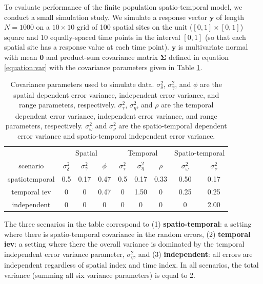 \documentclass[]{interact}
\theoremstyle{plain}%
\theoremstyle{definition}
\theoremstyle{remark}
\begin{document}
To evaluate performance of the finite population spatio-temporal model,
we conduct a small simulation study. We simulate a response vector
\(\mathbf{y}\) of length \(N = 1000\) on a \(10 \times 10\) grid of 100
spatial sites on the unit (\([0, 1] \times [0, 1]\)) square and 10
equally-spaced time points in the interval \([0, 1]\) (so that each
spatial site has a response value at each time point). \(\mathbf{y}\) is
multivariate normal with mean \(\mathbf{0}\) and product-sum covariance
matrix \(\bm{\Sigma}\) defined in equation \ref{equation:var} with the
covariance parameters given in Table \ref{tab:simparmtab}.

\begin{table}[H]

\caption{\label{tab:simparmtab}Covariance parameters used to simulate data. $\sigma^2_{\delta}$, $\sigma^2_{\gamma}$, and $\phi$ are the spatial dependent error variance, independent error variance, and range parameters, respectively. $\sigma^2_{\tau}$, $\sigma^2_{\eta}$, and $\rho$ are the temporal dependent error variance, independent error variance, and range parameters, respectively. $\sigma^2_{\omega}$ and $\sigma^2_{\nu}$ are the spatio-temporal dependent error variance and spatio-temporal independent error variance.}
\centering
\begin{tabular}[t]{ccccccccc}
\toprule
\multicolumn{1}{c}{ } & \multicolumn{3}{c}{Spatial} & \multicolumn{3}{c}{Temporal} & \multicolumn{2}{c}{Spatio-temporal} \\
\cmidrule(l{3pt}r{3pt}){2-4} \cmidrule(l{3pt}r{3pt}){5-7} \cmidrule(l{3pt}r{3pt}){8-9}
scenario & $\sigma^2_{\delta}$ & $\sigma^2_{\gamma}$ & $\phi$ & $\sigma^2_{\tau}$ & $\sigma^2_{\eta}$ & $\rho$ & $\sigma^2_{\omega}$ & $\sigma^2_{\nu}$\\
\midrule
spatiotemporal & 0.5 & 0.17 & 0.47 & 0.5 & 0.17 & 0.33 & 0.50 & 0.17\\
temporal iev & 0 & 0 & 0.47 & 0 & 1.50 & 0 & 0.25 & 0.25\\
independent & 0 & 0 & 0 & 0 & 0 & 0 & 0 & 2.00\\
\bottomrule
\end{tabular}
\end{table}

The three scenarios in the table correspond to (1)
\textbf{spatio-temporal}: a setting where there is spatio-temporal
covariance in the random errors, (2) \textbf{temporal iev}: a setting
where there the overall variance is dominated by the temporal
independent error variance parameter, \(\sigma^2_{\eta}\), and (3)
\textbf{independent}: all errors are independent regardless of spatial
index and time index. In all scenarios, the total variance (summing all
six variance parameters) is equal to 2.
\end{document}
